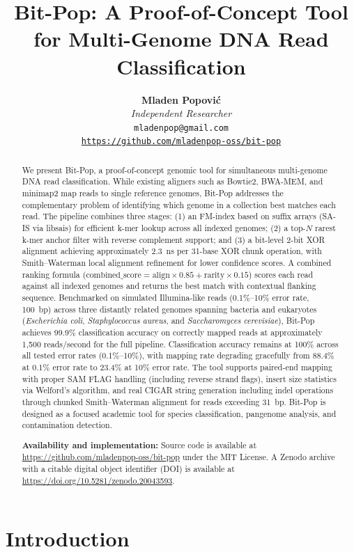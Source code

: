 \documentclass[10pt]{article}
\title{\textbf{Bit-Pop: A Proof-of-Concept Tool for Multi-Genome DNA Read Classification}}
\author{\textbf{Mladen Popovi\'{c}}\\
\textit{Independent Researcher}\\
\texttt{mladenpop@gmail.com}\\
\texttt{\url{https://github.com/mladenpop-oss/bit-pop}}}
\date{}
\begin{document}
\maketitle

\begin{abstract}
We present Bit-Pop, a proof-of-concept genomic tool for simultaneous multi-genome DNA read classification. While existing aligners such as Bowtie2, BWA-MEM, and minimap2 map reads to single reference genomes, Bit-Pop addresses the complementary problem of identifying which genome in a collection best matches each read. The pipeline combines three stages: (1) an FM-index based on suffix arrays (SA-IS via libsais) for efficient k-mer lookup across all indexed genomes; (2) a top-$N$ rarest k-mer anchor filter with reverse complement support; and (3) a bit-level 2-bit XOR alignment achieving approximately 2.3~ns per 31-base XOR chunk operation, with Smith--Waterman local alignment refinement for lower confidence scores. A combined ranking formula ($\text{combined\_score} = \text{align} \times 0.85 + \text{rarity} \times 0.15$) scores each read against all indexed genomes and returns the best match with contextual flanking sequence. Benchmarked on simulated Illumina-like reads (0.1\%--10\% error rate, 100~bp) across three distantly related genomes spanning bacteria and eukaryotes (\textit{Escherichia coli}, \textit{Staphylococcus aureus}, and \textit{Saccharomyces cerevisiae}), Bit-Pop achieves 99.9\% classification accuracy on correctly mapped reads at approximately 1,500 reads/second for the full pipeline. Classification accuracy remains at 100\% across all tested error rates (0.1\%--10\%), with mapping rate degrading gracefully from 88.4\% at 0.1\% error rate to 23.4\% at 10\% error rate. The tool supports paired-end mapping with proper SAM FLAG handling (including reverse strand flags), insert size statistics via Welford's algorithm, and real CIGAR string generation including indel operations through chunked Smith--Waterman alignment for reads exceeding 31~bp. Bit-Pop is designed as a focused academic tool for species classification, pangenome analysis, and contamination detection.

\noindent\textbf{Availability and implementation:} Source code is available at \url{https://github.com/mladenpop-oss/bit-pop} under the MIT License. A Zenodo archive with a citable digital object identifier (DOI) is available at \url{https://doi.org/10.5281/zenodo.20043593}.
\end{abstract}

\section{Introduction}
\end{document}
